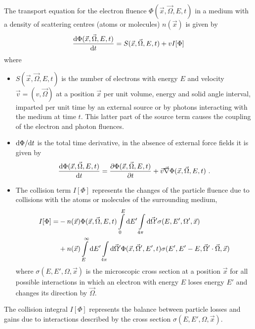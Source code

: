 The transport equation for the electron fluence
$\Phi(\vec{x},\vec{\Omega},E,t)$ in a medium with a density of
scattering centres (atoms or molecules) $n(\vec{x})$ is given by
\begin{equation}
\label{transport1}
{{\rm d}\Phi(\vec{x},\vec{\Omega},E,t) \over {\rm d}t} =
\index{electron transport!general discussion}
S(\vec{x},\vec{\Omega},E,t) + v I[\Phi]
\end{equation}
where
\begin{itemize}
\item
$S(\vec{x},\vec{\Omega},E,t)$ is the number of electrons with energy
$E$ and velocity $\vec{v} = (v,\vec{\Omega})$ at a position $\vec{x}$ per unit
volume, energy and solid angle interval, imparted per unit time
by an external source or
by photons interacting with the medium at time $t$. This latter part of the
source term causes the coupling of the electron and photon fluences.
\item
${\rm d}\Phi/{\rm d}t$ is the total time derivative, in the absence
of external force fields it is given by
\begin{equation}
{{\rm d}\Phi(\vec{x},\vec{\Omega},E,t) \over {\rm d}t}  =
{\partial \Phi(\vec{x},\vec{\Omega},E,t) \over \partial t} +
\vec{v} \vec{\nabla} \Phi(\vec{x},\vec{\Omega},E,t)~.
\end{equation}
\item
{}
The collision term $I[\Phi]$ represents the changes of the particle
fluence due to collisions with the atoms or molecules of the
surrounding medium,
\begin{equation}
\begin{split}
I[\Phi]  =
 & - n(\vec{x}) \Phi(\vec{x},\vec{\Omega},E,t)
\int\limits_0^E {\rm d} E' \int\limits_{4 \pi} {\rm d} \vec{\Omega}'
\sigma(E,E',\Omega',\vec{x}) \\
& +
n(\vec{x}) \int\limits_E^\infty {\rm d} E' \int\limits_{4 \pi}
{\rm d}\vec{\Omega}'
\Phi(\vec{x},\vec{\Omega}',E',t)
\sigma(E',E'-E,\vec{\Omega}'\cdot \vec{\Omega},\vec{x})
\end{split}
\end{equation}
where
$\sigma(E,E',\Omega,\vec{x})$ is the microscopic cross section
at a position $\vec{x}$ for all possible interactions in which
an electron with energy $E$ loses energy $E'$ and changes its direction
by $\vec{\Omega}$.
\end{itemize}
The collision integral $I[\Phi]$ represents the balance between
particle losses and gains due to interactions described by the
cross section $\sigma(E,E',\Omega,\vec{x})$.


